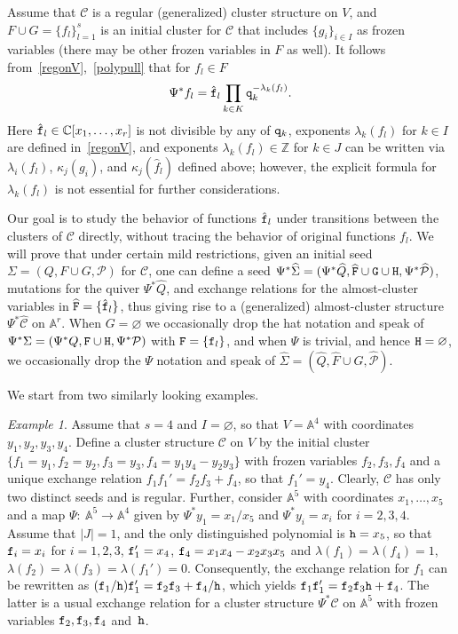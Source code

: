 \documentclass{amsart}
\theoremstyle{definition}
\theoremstyle{remark}
\newtheorem{example}[theorem]{Example}
\numberwithin{equation}{section}
\numberwithin{theorem}{section}
\def\AA{{\mathbb A}}
\def\C{{\mathbb C}}
\def\CC{{\mathcal C}}
\def\P{{\mathcal P}}
\def\Z{{\mathbb Z}}
\def\ttf{{\tt f}}
\def\tth{{\tt h}}
\def\ttq{{\tt q}}
\def\ttF{{\tt F}}
\def\ttG{{\tt G}}
\def\ttH{{\tt H}}
\def\:{{:\ }}
\begin{document}
Assume that $\CC$ is a regular (generalized) cluster structure on $V$, and $F\cup G=\{f_l\}_{l=1}^s$ is an initial cluster for $\CC$ that includes $\{g_i\}_{i\in I}$ as frozen variables (there may be other frozen variables in $F$ as well).  It follows from~\eqref{regonV},~\eqref{polypull} that for $f_l\in F$ 
\begin{equation}\label{regpull}
\Psi^*f_l=\hat\ttf_l\prod_{k\in K}\ttq_k^{-\lambda_k(f_l)}.
\end{equation}
Here $\hat\ttf_l\in\C[x_1,\dots,x_r]$ is not divisible by any of $\ttq_k$, exponents $\lambda_k(f_l)$ for $k\in I$ are defined 
in~\eqref{regonV}, and exponents $\lambda_k(f_l)\in\Z$ for $k\in J$ can be written
via $\lambda_i(f_l)$, $\kappa_j(g_i)$, and $\kappa_j(\hat f_l)$ defined above; however, the explicit 
formula for $\lambda_k(f_l)$ is not essential for further considerations.

Our goal is to study the behavior of functions $\hat\ttf_l$ under transitions between the clusters of $\CC$ directly,
without tracing the behavior of original functions $f_l$.
 We will prove that under certain mild restrictions, given an initial seed $\Sigma=(Q,F\cup G,\P)$ for $\CC$, one can define a seed $\Psi^*\widehat{\Sigma}=(\Psi^*\widehat Q, \widehat{\tt F}\cup\ttG\cup\ttH, \Psi^*\widehat\P)$, mutations for the quiver $\Psi^*\widehat Q$, and exchange relations for the almost-cluster variables in $\widehat {\tt F}=\{\hat \ttf_l\}$, thus giving rise to a (generalized) almost-cluster structure $\Psi^*\widehat{\CC}$ on $\AA^r$.
When $G=\varnothing$ we occasionally drop the hat notation and speak of 
$\Psi^*{\Sigma}=(\Psi^* Q, {\tt F}\cup\ttH, \Psi^*\P)$ with $\ttF=\{\ttf_l\}$, and when $\Psi$ is trivial, and hence 
$\ttH=\varnothing$, we occasionally drop the $\Psi$ notation and speak of  $\widehat{\Sigma}=(\widehat Q, \widehat{F}\cup G, \widehat\P)$.

We start from two similarly looking examples.

\begin{example} \label{goodex}
Assume that $s=4$ and $I=\varnothing$, so that $V=\AA^4$ with coordinates $y_1, y_2, y_3, y_4$. Define a cluster structure $\CC$ on $V$ 
by the initial cluster $\{f_1=y_1, f_2=y_2, f_3=y_3, f_4=y_1y_4-y_2y_3\}$ with frozen variables $f_2, f_3, f_4$ and a unique exchange relation $f_1f_1'=f_2f_3+f_4$, so that $f_1'=y_4$. Clearly, $\CC$ has only two distinct seeds and is regular. Further, consider $\AA^5$ with coordinates $x_1,\dots,x_5$ and a map $\Psi\:\AA^5\to\AA^4$ given by
$\Psi^*y_1=x_1/x_5$ and $\Psi^*y_i=x_i$ for $i=2,3,4$. Assume that $|J|=1$, and the only distinguished polynomial is 
$\tth=x_5$, so that $\ttf_i= x_i$ for $i=1,2,3$, $\ttf_1'=x_4$, $\ttf_4=  x_1x_4-x_2x_3x_5$ and 
$\lambda(f_1)=\lambda(f_4)=1$, $\lambda(f_2)=\lambda(f_3)=\lambda(f_1')=0$. Consequently, the exchange relation for 
$f_1$ 
can be rewritten as $(\ttf_1/\tth) \ttf_1'= \ttf_2 \ttf_3 + \ttf_4/\tth$, which yields  
$ \ttf_1 \ttf_1'= \ttf_2 \ttf_3 \tth+ \ttf_4$. The latter is a usual exchange relation for a cluster structure 
$\Psi^*{\CC}$ on $\AA^5$ with frozen variables $\ttf_2,  \ttf_3, \ttf_4$ and~$\tth$.
\end{example}
\end{document}
